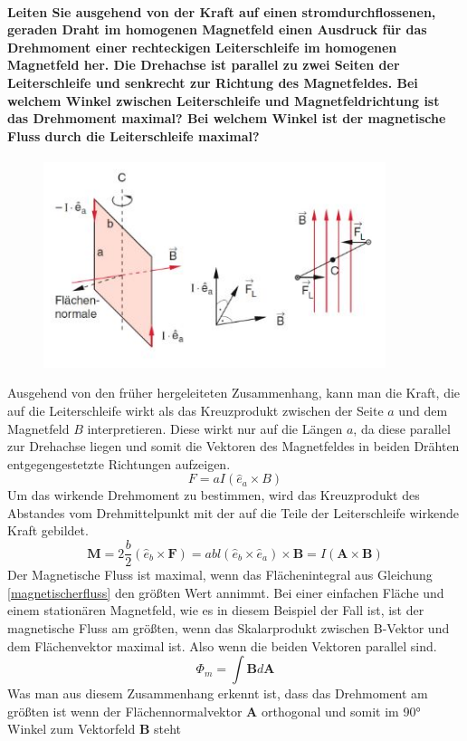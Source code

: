 \documentclass[a4paper, 11pt, ngerman, parskip=half-]{scrartcl}
\begin{document}
\paragraph{Leiten Sie ausgehend von der Kraft auf einen stromdurchflossenen, geraden Draht im
homogenen Magnetfeld einen Ausdruck für das Drehmoment einer rechteckigen Leiterschleife im
homogenen Magnetfeld her. Die Drehachse ist parallel zu zwei Seiten der Leiterschleife und senkrecht
zur Richtung des Magnetfeldes. Bei welchem Winkel zwischen Leiterschleife und Magnetfeldrichtung ist
das Drehmoment maximal? Bei welchem Winkel ist der magnetische Fluss durch die Leiterschleife
maximal?}
\begin{figure}[H]
    \centering
    \label{Drehmoment}
    \includegraphics[height=6cm]{image/5/5.5.JPG}
\end{figure}
Ausgehend von den früher hergeleiteten Zusammenhang, kann man die Kraft, die auf die Leiterschleife wirkt als das Kreuzprodukt zwischen der Seite $a$ und dem Magnetfeld $B$ interpretieren. 
Diese wirkt nur auf die Längen $a$, da diese parallel zur Drehachse liegen und somit die Vektoren des Magnetfeldes in beiden Drähten entgegengestetzte Richtungen aufzeigen.
\begin{equation}
    F = a I ( \hat{e}_a \times B)
\end{equation}
Um das wirkende Drehmoment zu bestimmen, wird das Kreuzprodukt des Abstandes vom Drehmittelpunkt mit der auf die Teile der Leiterschleife wirkende Kraft gebildet.
\begin{equation}
    \textbf{M} = 2\frac{b}{2} ( \hat{e}_b \times \textbf{F}) = abl (\hat{e}_b \times \hat{e}_a) \times \textbf{B} = I(\textbf{A}\times\textbf{B})
\end{equation}
Der Magnetische Fluss ist maximal, wenn das Flächenintegral aus Gleichung \ref{magnetischerfluss} den größten Wert annimmt. Bei einer einfachen Fläche und einem stationären Magnetfeld, wie es in diesem Beispiel der Fall ist, ist der magnetische Fluss am größten, wenn das 
Skalarprodukt zwischen B-Vektor und dem Flächenvektor maximal ist. Also wenn die beiden Vektoren parallel sind.
\begin{equation}
    \label{magnetischerFluss}
    \Phi_m = \int \textbf{B} d\textbf{A}
\end{equation}
Was man aus diesem Zusammenhang erkennt ist, dass das Drehmoment am größten ist wenn der Flächennormalvektor $\textbf{A}$ orthogonal und somit im 90° Winkel zum Vektorfeld $\textbf{B}$ steht
\end{document}
